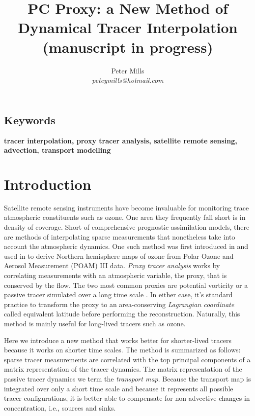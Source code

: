 \documentclass{article}
\begin{document}
\title{PC Proxy: a New Method of Dynamical Tracer Interpolation\\(manuscript in progress)}

\author{Peter Mills\\\textit{peteymills@hotmail.com}}

\maketitle

\pagestyle{myheadings}

\subsection*{Keywords}
\textbf{tracer interpolation, proxy tracer analysis, satellite remote sensing, advection, transport modelling}

\newcommand{\vect}[1]{\ensuremath{\vec #1}}

\tableofcontents

\section{Introduction}

Satellite remote sensing instruments have become invaluable for monitoring
trace atmospheric constituents such as ozone.
One area they frequently fall short is in density of coverage.
Short of comprehensive prognostic assimilation models, there are methods of
interpolating sparse measurements that nonetheless take into account the
atmospheric dynamics.
One such method was first introduced in \citet{Butchart_Remsberg1986}
and used in \citet{Randall_etal2002} to derive Northern hemisphere maps
of ozone from Polar Ozone and Aerosol Measurement (POAM) III data.
{\it Proxy tracer analysis} works by correlating
measurements with an atmospheric variable, the proxy, that 
is conserved by the flow.
The two most common proxies are potential vorticity \citep{Hoskins_etal1985} 
or a passive tracer simulated over a long time scale \citep{Allen_Nakamura2003}.
In either case, it's standard practice to transform the proxy to an
area-conserving {\it Lagrangian coordinate} called equivalent latitude
before performing the reconstruction.
Naturally, this method is mainly useful for long-lived tracers such as ozone.

Here we introduce a new method that works better for shorter-lived tracers
because it works on shorter time scales.
The method is summarized as follows: sparse tracer measurements are 
correlated with the top principal components of a matrix representation
of the tracer dynamics.
The matrix representation of the passive tracer dynamics we term the
{\it transport map}.
Because the transport map is integrated over only a short time scale and 
because it represents all possible tracer configurations, it is better
able to 
compensate for non-advective changes in concentration, i.e., sources
and sinks.
\end{document}
